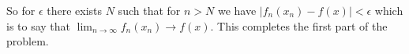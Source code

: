 \documentclass[11pt,reqno]{article}
\begin{document}
So for $\epsilon$ there exists $N$ such that for $n > N$ we have $|f_n(x_n)-f(x)| < \epsilon$ which is to say that $\lim_{n \to \infty} f_n(x_n) \to f(x)$. This completes the first part of the problem.\\
\end{document}
